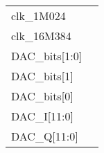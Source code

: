 \documentclass[journal,twoside]{IEEEtran}
\begin{document}
\begin{figure}
  \sffamily\notsotiny
  \begin{tabularx}{\linewidth}{@{}lX@{}}
    clk\_1M024 &  \\
    clk\_16M384 &  \\
    DAC\_bits[1:0] &  \\
    DAC\_bits[1] &  \\
    DAC\_bits[0] &  \\
    DAC\_I[11:0] &  \\
    DAC\_Q[11:0] &  \\
  \end{tabularx}%
\end{figure}
\end{document}
